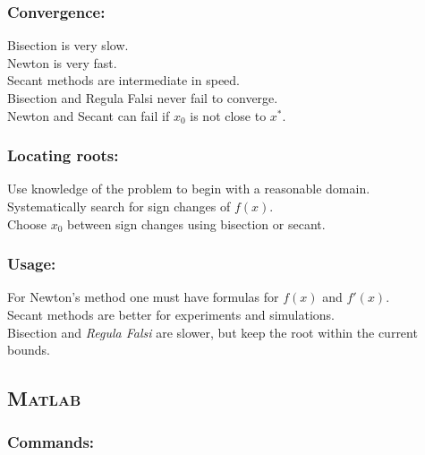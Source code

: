 
\subsubsection*{Convergence:}
Bisection is very slow.\\
Newton is very fast.\\
Secant methods are intermediate in speed.\\
Bisection and Regula Falsi never fail to converge.\\
Newton and Secant can fail if $x_0$ is not close to $x^*$.


\subsubsection*{Locating roots:}
Use knowledge of the problem to begin with a reasonable domain.\\
Systematically search for sign changes of $f(x)$.\\
Choose $x_0$ between sign changes using bisection or secant.



\subsubsection*{Usage:}
For Newton's method one must have formulas for $f(x)$ and $f'(x)$.\\
Secant methods are better for experiments and simulations.\\
Bisection and {\em Regula Falsi} are slower, but keep the root within the current bounds.


\subsection*{\textsc{Matlab}}



\subsubsection*{Commands:}


